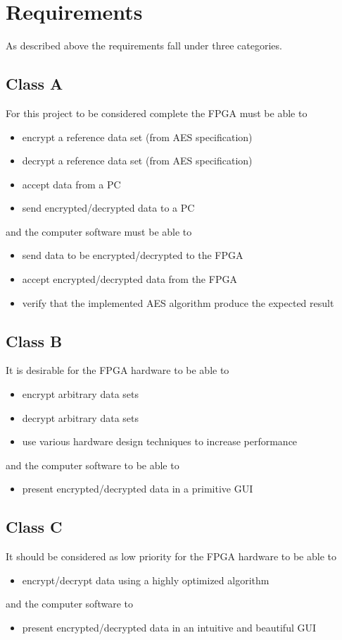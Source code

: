 \documentclass[12pt]{article}
\begin{document}
\section{Requirements}\label{requirements}
As described above the requirements fall under three categories.

\subsection*{Class A}
For this project to be considered complete the FPGA must be able to
\begin{itemize}
\item encrypt a reference data set (from AES specification)
\item decrypt a reference data set (from AES specification)
\item accept data from a PC
\item send encrypted/decrypted data to a PC
\end{itemize}
and the computer software must be able to
\begin{itemize}
\item send data to be encrypted/decrypted to the FPGA
\item accept encrypted/decrypted data from the FPGA
\item verify that the implemented AES algorithm produce the expected result
\end{itemize}

\subsection*{Class B}
It is desirable for the FPGA hardware to be able to
\begin{itemize}
\item encrypt arbitrary data sets
\item decrypt arbitrary data sets
\item use various hardware design techniques to increase performance
\end{itemize}
and the computer software to be able to
\begin{itemize}
\item present encrypted/decrypted data in a primitive GUI
\end{itemize}

\subsection*{Class C}
It should be considered as low priority for the FPGA hardware to be able to
\begin{itemize}
\item encrypt/decrypt data using a highly optimized algorithm
\end{itemize}
and the computer software to
\begin{itemize}
\item present encrypted/decrypted data in an intuitive and beautiful GUI
\end{itemize}
\end{document}
